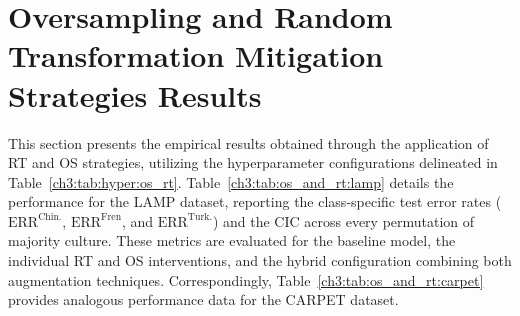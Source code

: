 \section{Oversampling and Random Transformation Mitigation Strategies Results}
This section presents the empirical results obtained through the application of RT and OS strategies, utilizing the hyperparameter configurations delineated in Table~\ref{ch3:tab:hyper:os_rt}.
Table~\ref{ch3:tab:os_and_rt:lamp} details the performance for the LAMP dataset, reporting the class-specific test error rates ($\text{ERR}^{\text{Chin.}}$, $\text{ERR}^{\text{Fren}}$, and $\text{ERR}^{\text{Turk.}}$) and the CIC across every permutation of majority culture. 
These metrics are evaluated for the baseline model, the individual RT and OS interventions, and the hybrid configuration combining both augmentation techniques. 
Correspondingly, Table~\ref{ch3:tab:os_and_rt:carpet} provides analogous performance data for the CARPET dataset.
%
